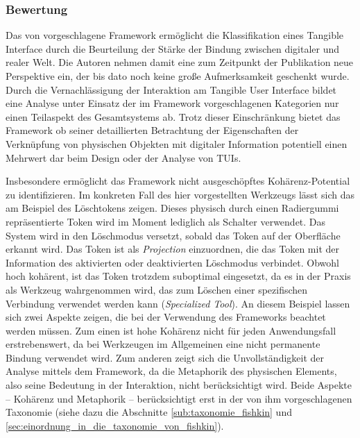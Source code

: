 
\subsubsection{Bewertung} %
\label{sub:bewertung}

Das von \citet{Koleva03} vorgeschlagene Framework ermöglicht die Klassifikation eines Tangible Interface durch die Beurteilung der Stärke der Bindung zwischen digitaler und realer Welt. Die Autoren nehmen damit eine zum Zeitpunkt der Publikation neue Perspektive ein, der bis dato noch keine große Aufmerksamkeit geschenkt wurde. Durch die Vernachlässigung der Interaktion am Tangible User Interface bildet eine Analyse unter Einsatz der im Framework vorgeschlagenen Kategorien nur einen Teilaspekt des Gesamtsystems ab. Trotz dieser Einschränkung bietet das Framework ob seiner detaillierten Betrachtung der Eigenschaften der Verknüpfung von physischen Objekten mit digitaler Information potentiell einen Mehrwert dar beim Design oder der Analyse von \glspl{TUI}. 

Insbesondere ermöglicht das Framework nicht ausgeschöpftes Kohärenz-Potential zu identifizieren. Im konkreten Fall des hier vorgestellten Werkzeugs lässt sich das am Beispiel des Löschtokens zeigen. Dieses physisch durch einen Radiergummi repräsentierte Token wird im Moment lediglich als Schalter verwendet. Das System wird in den Löschmodus versetzt, sobald das Token auf der Oberfläche erkannt wird. Das Token ist als \emph{Projection} einzuordnen, die das Token mit der Information des aktivierten oder deaktivierten Löschmodus verbindet. Obwohl hoch kohärent, ist das Token trotzdem suboptimal eingesetzt, da es in der Praxis als Werkzeug wahrgenommen wird, das zum Löschen einer spezifischen Verbindung verwendet werden kann (\emph{Specialized Tool}). An diesem Beispiel lassen sich zwei Aspekte zeigen, die bei der Verwendung des Frameworks beachtet werden müssen. Zum einen ist hohe Kohärenz nicht für jeden Anwendungsfall erstrebenswert, da bei Werkzeugen im Allgemeinen eine nicht permanente Bindung verwendet wird. Zum anderen zeigt sich die Unvollständigkeit der Analyse mittels dem Framework, da die Metaphorik des physischen Elements, also seine Bedeutung in der Interaktion, nicht berücksichtigt wird. Beide Aspekte -- Kohärenz und Metaphorik -- berücksichtigt erst \citet{Fishkin04} in der von ihm vorgeschlagenen Taxonomie (siehe dazu die Abschnitte \ref{sub:taxonomie_fishkin} und \ref{sec:einordnung_in_die_taxonomie_von_fishkin}).

